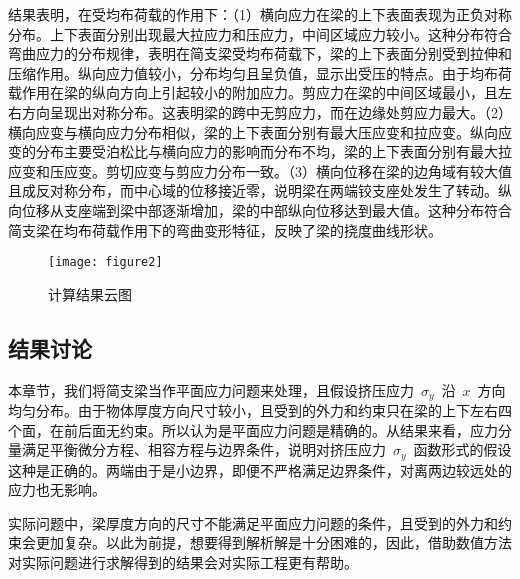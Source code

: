 结果表明，在受均布荷载的作用下：（1）横向应力在梁的上下表面表现为正负对称分布。上下表面分别出现最大拉应力和压应力，中间区域应力较小。这种分布符合弯曲应力的分布规律，表明在简支梁受均布荷载下，梁的上下表面分别受到拉伸和压缩作用。纵向应力值较小，分布均匀且呈负值，显示出受压的特点。由于均布荷载作用在梁的纵向方向上引起较小的附加应力。剪应力在梁的中间区域最小，且左右方向呈现出对称分布。这表明梁的跨中无剪应力，而在边缘处剪应力最大。（2）横向应变与横向应力分布相似，梁的上下表面分别有最大压应变和拉应变。纵向应变的分布主要受泊松比与横向应力的影响而分布不均，梁的上下表面分别有最大拉应变和压应变。剪切应变与剪应力分布一致。（3）横向位移在梁的边角域有较大值且成反对称分布，而中心域的位移接近零，说明梁在两端铰支座处发生了转动。纵向位移从支座端到梁中部逐渐增加，梁的中部纵向位移达到最大值。这种分布符合简支梁在均布荷载作用下的弯曲变形特征，反映了梁的挠度曲线形状。
\begin{figure}[htbp]
    \centering
	\texttt{[image: figure2]}
    \caption{计算结果云图}
    \label{fig:EPMplot}
\end{figure}
\subsection{结果讨论}
\label{cha:discussion1}
本章节，我们将简支梁当作平面应力问题来处理，且假设挤压应力~$\sigma_y$~沿~$x$~方向均匀分布。由于物体厚度方向尺寸较小，且受到的外力和约束只在梁的上下左右四个面，在前后面无约束。所以认为是平面应力问题是精确的。从结果来看，应力分量满足平衡微分方程、相容方程与边界条件，说明对挤压应力~$\sigma_y$~函数形式的假设这种是正确的。两端由于是小边界，即便不严格满足边界条件，对离两边较远处的应力也无影响。

实际问题中，梁厚度方向的尺寸不能满足平面应力问题的条件，且受到的外力和约束会更加复杂。以此为前提，想要得到解析解是十分困难的，因此，借助数值方法对实际问题进行求解得到的结果会对实际工程更有帮助。